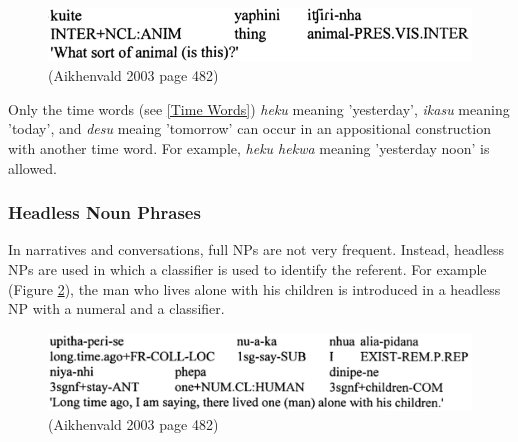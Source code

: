 \documentclass{article}
\begin{document}
\begin{figure}[h!]
  \centering
  \includegraphics[scale = 0.4]{whatanimal.png}
    \caption{(Aikhenvald 2003 page 482)}
    \label{whatanimal}
\end{figure}

\noindent Only the time words (see \ref*{Time Words}) \textit{heku} meaning 'yesterday', \textit{ikasu} meaning 'today', and \textit{desu} meaing 'tomorrow' can occur in an appositional construction with another time word. For example, \textit{heku hekwa} meaning 'yesterday noon' is allowed.

\subsubsection{Headless Noun Phrases} \label{Headless NPs}
In narratives and conversations, full NPs are not very frequent. Instead, headless NPs are used in which a classifier is used to identify the referent. For example (Figure \ref*{oneman}), the man who lives alone with his children is introduced in a headless NP with a numeral and a classifier.

\begin{figure}[h!]
  \centering
  \includegraphics[scale = 0.49]{onemanexample.png}
    \caption{(Aikhenvald 2003 page 482)}
    \label{oneman}
\end{figure}



\end{document}
